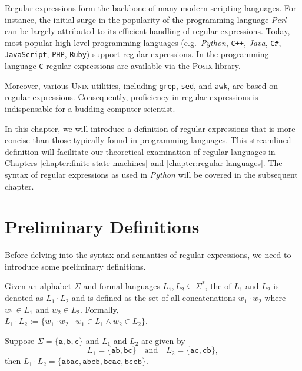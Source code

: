 Regular expressions form the backbone of many modern scripting languages. For instance, the initial surge in
the popularity of the programming language \href{http://en.wikipedia.org/wiki/Perl}{\textsl{Perl}} can be
largely attributed to its efficient handling of regular expressions. Today,  most popular high-level
programming languages (e.g.~\textsl{Python}, \texttt{C++}, \textsl{Java}, \texttt{C\#}, \texttt{JavaScript},
\texttt{PHP}, \texttt{Ruby}) support regular expressions.  In the programming language \texttt{C} regular
expressions are available via the \textsc{Posix} library.  

Moreover, various \textsc{Unix} utilities, including \href{http://en.wikipedia.org/wiki/Grep}{\texttt{grep}},
\href{http://en.wikipedia.org/wiki/Sed}{\texttt{sed}}, and
\href{http://en.wikipedia.org/wiki/Awk}{\texttt{awk}}, are based on regular
expressions. Consequently, proficiency in regular expressions is indispensable for a budding computer scientist.

In this chapter, we will introduce a definition of regular expressions that is more concise than those typically found in programming languages. This streamlined definition will facilitate our theoretical examination of regular languages in Chapters \ref{chapter:finite-state-machines} and \ref{chapter:regular-languages}. The syntax of regular expressions as used in \textsl{Python} will be covered in the subsequent chapter.

\section{Preliminary Definitions}
Before delving into the syntax and semantics of regular expressions, we need to introduce some preliminary definitions.

\begin{Definition}
  Given an alphabet $ \Sigma $ and formal languages $ L_1, L_2 \subseteq \Sigma^* $, the
   of $ L_1 $ and $ L_2 $ is denoted as $ L_1 \cdot L_2 $ and
  is defined as the set of all concatenations $ w_1 \cdot w_2 $ where $ w_1 \in L_1 $ and $ w_2 \in L_2
  $. Formally,  
\\[0.2cm]
\hspace*{1.3cm}
$ L_1 \cdot L_2 := \{ w_1 \cdot w_2 \mid w_1 \in L_1 \land w_2 \in L_2 \}$. \eox 
\end{Definition}

\exampleEng
Suppose $ \Sigma = \{ \texttt{a}, \texttt{b}, \texttt{c} \} $ and $ L_1 $ and $ L_2 $ are given by
\[
L_1 = \{ \texttt{ab}, \texttt{bc} \} \quad \text{and} \quad L_2 = \{ \texttt{ac}, \texttt{cb} \},
\]
then $ L_1 \cdot L_2 = \{ \texttt{abac}, \texttt{abcb}, \texttt{bcac}, \texttt{bccb} \} $. \eox


